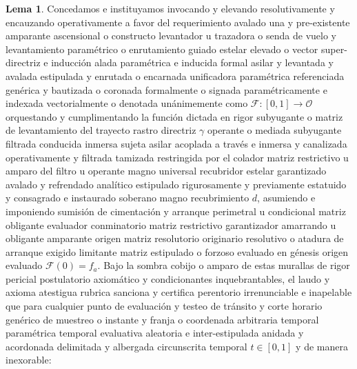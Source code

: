 \documentclass[11pt,a4paper]{article}
\theoremstyle{definition}
\newtheorem{lema}{Lema}[section]
\theoremstyle{remark}
\numberwithin{equation}{section}
\begin{document}
\begin{lema}
Concedamos e instituyamos invocando y elevando resolutivamente y encauzando operativamente a favor del requerimiento avalado una y pre-existente amparante ascensional o constructo levantador u trazadora o senda de vuelo y levantamiento paramétrico o enrutamiento guiado estelar elevado o vector super-directriz e inducción alada paramétrica e inducida formal asilar y levantada y avalada estipulada y enrutada o encarnada unificadora paramétrica referenciada genérica y bautizada o coronada formalmente o signada paramétricamente e indexada vectorialmente o denotada unánimemente como $\mathcal{F}: [0, 1] \to \mathcal{O}$ orquestando y cumplimentando la función dictada en rigor subyugante o matriz de levantamiento del trayecto rastro directriz $\gamma$ operante o mediada subyugante filtrada conducida inmersa sujeta asilar acoplada a través e inmersa y canalizada operativamente y filtrada tamizada restringida por el colador matriz restrictivo u amparo del filtro u operante magno universal recubridor estelar garantizado avalado y refrendado analítico estipulado rigurosamente y previamente estatuido y consagrado e instaurado soberano magno recubrimiento $d$, asumiendo e imponiendo sumisión de cimentación y arranque perimetral u condicional matriz obligante evaluador conminatorio matriz restrictivo garantizador amarrando u obligante amparante origen matriz resolutorio originario resolutivo o atadura de arranque exigido limitante matriz estipulado o forzoso evaluado en génesis origen evaluado $\mathcal{F}(0) = f_a$.
Bajo la sombra cobijo o amparo de estas murallas de rigor pericial postulatorio axiomático y condicionantes inquebrantables, el laudo y axioma atestigua rubrica sanciona y certifica perentorio irrenunciable e inapelable que para cualquier punto de evaluación y testeo de tránsito y corte horario genérico de muestreo o instante y franja o coordenada arbitraria temporal paramétrica temporal evaluativa aleatoria e inter-estipulada anidada y acordonada delimitada y albergada circunscrita temporal $t \in [0, 1]$ y de manera inexorable:

\end{lema}
\end{document}
